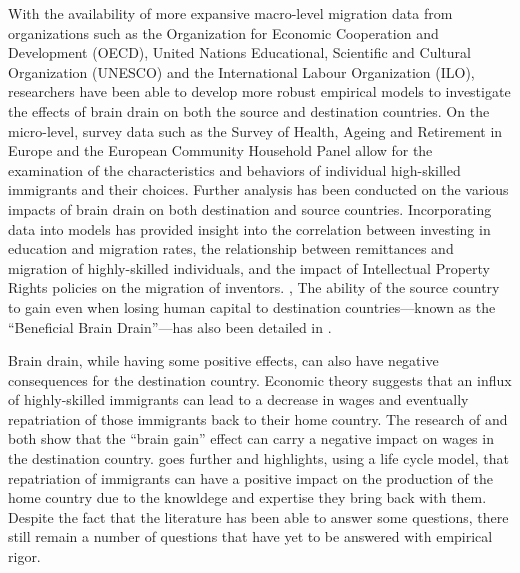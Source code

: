 \documentclass[12pt]{article}
\newcommand{\pointer}[1]{{\color{red} \center \textit{#1}}}
\begin{document}
With the availability of more expansive macro-level migration data from organizations such as the Organization for Economic Cooperation and Development (OECD), United Nations Educational, Scientific and Cultural Organization (UNESCO) and the International Labour Organization (ILO), researchers have been able to develop more robust empirical models to investigate the effects of brain drain on both the source and destination countries.
On the micro-level, survey data such as the Survey of Health, Ageing and Retirement in Europe and the European Community Household Panel allow for the examination of the characteristics and behaviors of individual high-skilled immigrants and their choices.
Further analysis has been conducted on the various impacts of brain drain on both destination and source countries.
Incorporating data into models has provided insight into the correlation between investing in education and migration rates, the relationship between remittances and migration of highly-skilled individuals, and the impact of Intellectual Property Rights policies on the migration of inventors. \autocite{beine_brain_2001}, \autocite{mcausland_bidding_2011}
The ability of the source country to gain even when losing human capital to destination countries—known as the ``Beneficial Brain Drain''—has also been detailed in \citeauthor{kuhn_international_2006}.

Brain drain, while having some positive effects, can also have negative consequences for the destination country.
Economic theory suggests that an influx of highly-skilled immigrants can lead to a decrease in wages and eventually repatriation of those immigrants back to their home country.
The research of \citeauthor{chiswick_high_2005} and \citeauthor{hussain_reversing_2015} both show that the ``brain gain'' effect can carry a negative impact on wages in the destination country.
\citeauthor{hussain_reversing_2015} goes further and highlights, using a life cycle model, that repatriation of immigrants can have a positive impact on the production of the home country due to the knowldege and expertise they bring back with them. 
Despite the fact that the literature has been able to answer some questions, there still remain a number of questions that have yet to be answered with empirical rigor.

\end{document}
